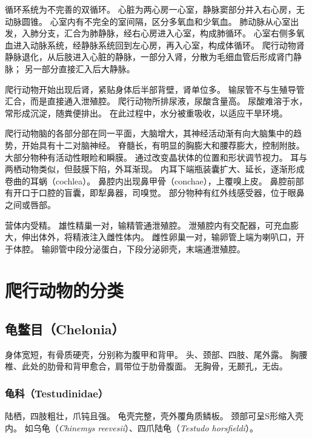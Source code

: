 \documentclass[11pt]{article}
\begin{document}
\newline

循环系统为不完善的双循环。
心脏为两心房一心室，静脉窦部分并入右心房，无动脉圆锥。
心室内有不完全的室间隔，区分多氧血和少氧血。
肺动脉从心室出发，入肺分支，汇合为肺静脉，经右心房进入心室，构成肺循环。
心室右侧多氧血进入动脉系统，经静脉系统回到左心房，再入心室，构成体循环。
爬行动物肾静脉退化，从后肢进入心脏的静脉，一部分入肾，分散为毛细血管后形成肾门静脉；
另一部分直接汇入后大静脉。

\newline

爬行动物开始出现后肾，紧贴身体后半部背壁，肾单位多。
输尿管不与生殖导管汇合，而是直接通入泄殖腔。
爬行动物所排尿液，尿酸含量高。
尿酸难溶于水，常形成沉淀，随粪便排出。
在此过程中，水分被重吸收，以适应干旱环境。

\newline

爬行动物脑的各部分部在同一平面，大脑增大，其神经活动渐有向大脑集中的趋势，开始具有十二对脑神经。
脊髓长，有明显的胸膨大和腰荐膨大，控制附肢。
大部分物种有活动性眼睑和瞬膜。
通过改变晶状体的位置和形状调节视力。
耳与两栖动物类似，但鼓膜下陷，外耳渐现。
内耳下端瓶装囊扩大、延长，逐渐形成卷曲的耳蜗（cochlea）。
鼻腔内出现鼻甲骨（conchae），上覆嗅上皮。
鼻腔前部有开口于口腔的盲囊，即犁鼻器，司嗅觉。
部分物种有红外线感受器，位于眼鼻之间或唇部。

\newline

营体内受精。
雄性精巢一对，输精管通泄殖腔。
泄殖腔内有交配器，可充血膨大，伸出体外，将精液注入雌性体内。
雌性卵巢一对，输卵管上端为喇叭口，开于体腔。
输卵管中段分泌蛋白，下段分泌卵壳，末端通泄殖腔。

\section{爬行动物的分类}
\subsection{龟鳖目（Chelonia）}
身体宽短，有骨质硬壳，分别称为腹甲和背甲。
头、颈部、四肢、尾外露。
胸腰椎、此处的肋骨和背甲愈合，肩带位于肋骨腹面。
无胸骨，无颞孔，无齿。

\subsubsection{龟科（Testudinidae）}
陆栖，四肢粗壮，爪钝且强。
龟壳完整，壳外覆角质鳞板。
颈部可呈S形缩入壳内。
如乌龟（\textit{Chinemys reevesii}）、四爪陆龟（\textit{Testudo horsfieldi}）。
\end{document}
